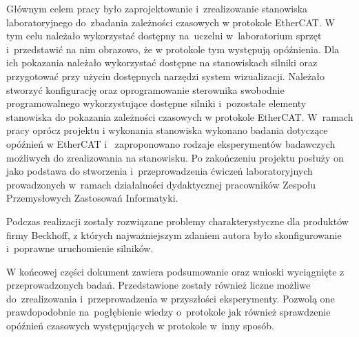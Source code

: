 Głównym celem pracy było zaprojektowanie i~zrealizowanie stanowiska laboratoryjnego do~zbadania zależności czasowych w protokole EtherCAT. W tym celu należało wykorzystać dostępny na~uczelni w~laboratorium sprzęt i~przedstawić na nim obrazowo, że w protokole tym występują opóźnienia. Dla ich pokazania należało wykorzystać dostępne na stanowiskach silniki oraz przygotować przy użyciu dostępnych narzędzi system wizualizacji.
Należało stworzyć konfigurację oraz oprogramowanie sterownika swobodnie programowalnego wykorzystujące dostępne silniki i~pozostałe elementy stanowiska do pokazania zależności czasowych w protokole EtherCAT.
W~ramach pracy oprócz projektu i wykonania stanowiska wykonano badania dotyczące opóźnień w EtherCAT i~ zaproponowano rodzaje eksperymentów badawczych możliwych do zrealizowania na stanowisku.
Po zakończeniu projektu posłuży on jako podstawa do stworzenia i~przeprowadzenia ćwiczeń laboratoryjnych prowadzonych w~ramach działalności dydaktycznej pracowników Zespołu Przemysłowych Zastosowań Informatyki.

Podczas realizacji zostały rozwiązane problemy charakterystyczne dla produktów firmy Beckhoff, z których najważniejszym zdaniem autora było skonfigurowanie i~poprawne uruchomienie silników.

W końcowej części dokument zawiera podsumowanie oraz wnioski wyciągnięte z przeprowadzonych badań. Przedstawione zostały również liczne możliwe do~zrealizowania i~przeprowadzenia w przyszłości eksperymenty. Pozwolą one prawdopodobnie na~pogłębienie wiedzy o~protokole jak również sprawdzenie opóźnień czasowych występujących w protokole w~inny sposób.
\clearpage